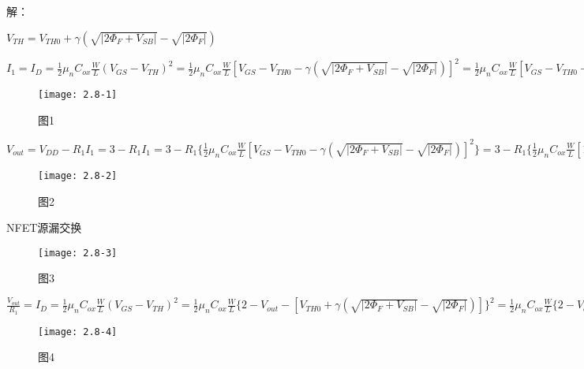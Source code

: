 


解：

\scalebox{3}{（a）}

$V_{TH}=V_{TH0}+\gamma(\sqrt{|2\Phi_F+V_{SB}|}-\sqrt{|2\Phi_F|})$

$I_1=I_D=\frac{1}{2}\mu_nC_{ox}\frac{W}{L}(V_{GS}-V_{TH})^2=\frac{1}{2}\mu_nC_{ox}\frac{W}{L}[V_{GS}-V_{TH0}-\gamma(\sqrt{|2\Phi_F+V_{SB}|}-\sqrt{|2\Phi_F|})]^2=\frac{1}{2}\mu_nC_{ox}\frac{W}{L}[V_{GS}-V_{TH0}-\gamma(\sqrt{|2\Phi_F+V_{DD}-V_{out}-V_{in}|}-\sqrt{|2\Phi_F|})]^2$

		\begin{figure}[H] %
	\begin{minipage}{\linewidth}
		\texttt{[image: 2.8-1]}
	\end{minipage}
	\caption*{图1} %
\end{figure}

\scalebox{3}{（b）}

$V_{out}=V_{DD}-R_1I_1=3-R_1I_1=3-R_1\{\frac{1}{2}\mu_nC_{ox}\frac{W}{L}[V_{GS}-V_{TH0}-\gamma(\sqrt{|2\Phi_F+V_{SB}|}-\sqrt{|2\Phi_F|})]^2\}=3-R_1\{\frac{1}{2}\mu_nC_{ox}\frac{W}{L}[1-0.7-0.45(\sqrt{|0.9+1-V_{in}|}-\sqrt{|0.9|})]^2\}=3-R_1\{\frac{1}{2}\mu_nC_{ox}\frac{W}{L}[0.3-0.45(\sqrt{1.9-V_{in}}-\sqrt{0.9})]^2\}$

		\begin{figure}[H] %
	\begin{minipage}{\linewidth}
		\texttt{[image: 2.8-2]}
	\end{minipage}
	\caption*{图2} %
\end{figure}

\scalebox{3}{（c）}

NFET源漏交换

		\begin{figure}[H] %
	\begin{minipage}{\linewidth}
		\texttt{[image: 2.8-3]}
	\end{minipage}
	\caption*{图3} %
\end{figure}

$\frac{V_{out}}{R_1}=I_D=\frac{1}{2}\mu_nC_{ox}\frac{W}{L}(V_{GS}-V_{TH})^2=\frac{1}{2}\mu_nC_{ox}\frac{W}{L}\{2-V_{out}-[V_{TH0}+\gamma(\sqrt{|2\Phi_F+V_{SB}|}-\sqrt{|2\Phi_F|})]\}^2=\frac{1}{2}\mu_nC_{ox}\frac{W}{L}\{2-V_{out}-[0.7+0.45(\sqrt{|0.9+V_{out}-V_{in}|}-\sqrt{|0.9|})]\}^2$

		\begin{figure}[H] %
	\begin{minipage}{\linewidth}
		\texttt{[image: 2.8-4]}
	\end{minipage}
	\caption*{图4} %
\end{figure}